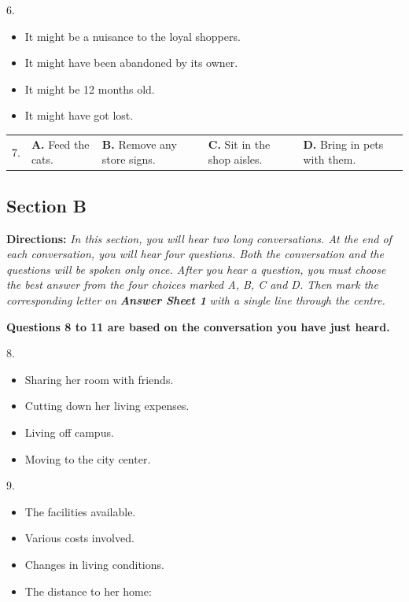 \documentclass[UTF8,11pt]{ctexart}
\begin{document}
6.


\begin{itemize}[leftmargin=2em,itemsep=.2em,topsep=.4em]\item[A.] It might be a nuisance to the loyal shoppers.
\item[B.] It might have been abandoned by its owner.
\item[C.] It might be 12 months old.
\item[D.] It might have got lost.
\end{itemize}

\noindent\begin{tabularx}{\linewidth}{@{}lXXXX@{}}7. & \textbf{A.} Feed the cats. & \textbf{B.} Remove any store signs. & \textbf{C.} Sit in the shop aisles. & \textbf{D.} Bring in pets with them.\\\end{tabularx}\par

\subsection*{\textbf{Section B}}


\textbf{Directions:} \textit{In this section, you will hear two long conversations. At the end of each conversation, you will hear} \textit{four questions. Both the conversation and the questions will be spoken only once. After you hear a question, you} \textit{must choose the best answer from the four choices marked A, B, C and D. Then mark the corresponding letter on} \textbf{\textit{Answer Sheet 1}}\textit{ with a single line through the centre.}


\textbf{Questions 8 to 11 are based on the conversation you have just heard.}


8.


\begin{itemize}[leftmargin=2em,itemsep=.2em,topsep=.4em]\item[A.] Sharing her room with friends.
\item[B.] Cutting down her living expenses.
\item[C.] Living off campus.
\item[D.] Moving to the city center.
\end{itemize}

9.


\begin{itemize}[leftmargin=2em,itemsep=.2em,topsep=.4em]\item[A.] The facilities available.
\item[B.] Various costs involved.
\item[C.] Changes in living conditions.
\item[D.] The distance to her home:
\end{itemize}
\end{document}

